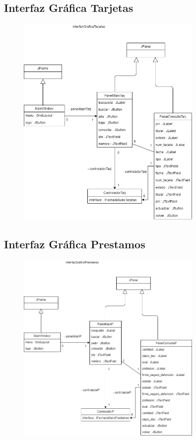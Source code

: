 \documentclass[12pt]{article}
\begin{document}
\subsection{Interfaz Gráfica Tarjetas}
\begin{figure}[H]
    \centering
    \includegraphics[width=0.8\textwidth]{images/InterfazGraficaTarjetasFinal.png}
\end{figure}

\subsection{Interfaz Gráfica Prestamos}
\begin{figure}[H]
    \centering
    \includegraphics[width=0.8\textwidth]{images/InterfazGraficaPrestamosFinal.png}
\end{figure}
\end{document}
